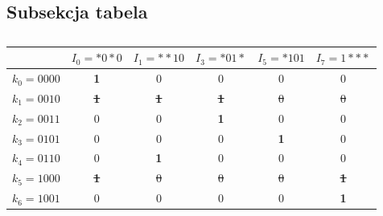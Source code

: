 \documentclass[a4paper,12pt]{article}
\begin{document}
    \subsection{Subsekcja tabela}\label{subsec:table}
    \begin{table}[H]
        \centering
        \begin{tabular}[t]{ |c||c|c|c|c|c| }
            \hline
            & $I_0 = {*}0{*}0$ & $I_1 = {*}{*}10$ & $I_3 = {*}01{*}$ & $I_5 = {*}101$ & $I_7 = 1{*}{*}{*}$ \\
            \hline
            \hline
            $k_0 = 0000$ & \textbf{1} & 0 & 0 & 0 & 0 \\
            \hline
            \sout{$k_1 = 0010$} &  \sout{\textbf{1}} &  \sout{\textbf{1}} &  \sout{\textbf{1}} & \sout{0} & \sout{0} \\
            \hline
            $k_2 = 0011$ & 0 & 0 & \textbf{1} & 0 & 0 \\
            \hline
            $k_3 = 0101$ & 0 & 0 & 0 & \textbf{1} & 0 \\
            \hline
            $k_4 = 0110$ & 0 & \textbf{1} & 0 & 0 & 0 \\
            \hline
            \sout{$k_5 = 1000$} &  \sout{\textbf{1}} & \sout{0} & \sout{0} & \sout{0} &  \sout{\textbf{1}} \\
            \hline
            $k_6 = 1001$ & 0 & 0 & 0 & 0 & \textbf{1} \\
            \hline
        \end{tabular}
        \caption{} \label{tab:min-block}
    \end{table}
    \newpage
    \printbibliography
\end{document}
